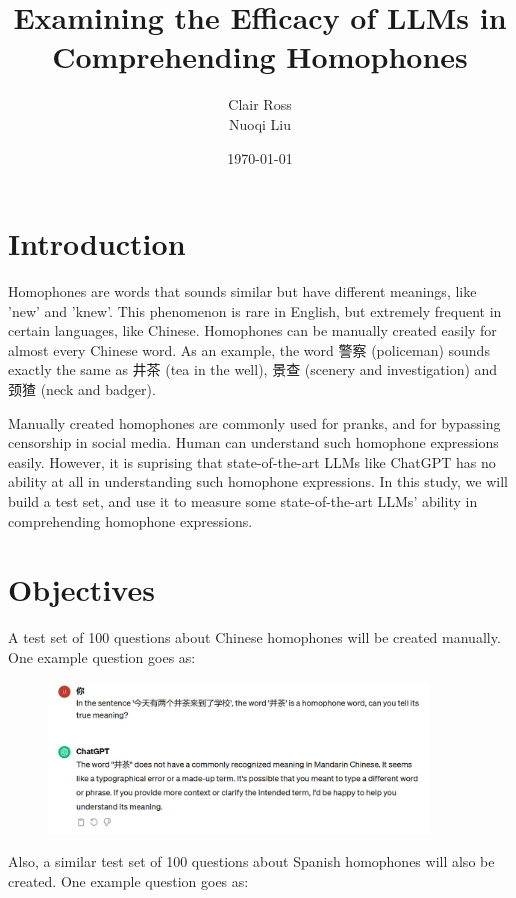 \documentclass{article}
\title{Examining the Efficacy of LLMs in Comprehending Homophones}
\author{Clair Ross\\Nuoqi Liu}
\date{\today}
\begin{document}
\maketitle

\section{Introduction}

Homophones are words that sounds similar but have different meanings, like 'new' and 'knew'. This phenomenon is rare in English, but extremely frequent in certain languages, like Chinese. Homophones can be manually created easily for almost every Chinese word. As an example, the word 警察 (policeman) sounds exactly the same as 井茶 (tea in the well), 景查 (scenery and investigation) and 颈猹 (neck and badger).

Manually created homophones are commonly used for pranks, and for bypassing censorship in social media. Human can understand such homophone expressions easily. However, it is suprising that state-of-the-art LLMs like ChatGPT has no ability at all in understanding such homophone expressions. In this study, we will build a test set, and use it to measure some state-of-the-art LLMs' ability in comprehending homophone expressions.

\section{Objectives}

A test set of 100 questions about Chinese homophones will be created manually. One example question goes as:

\begin{figure}[h]
    \centering
    \includegraphics[width=0.9\textwidth]{example_question_chinese.jpg}
\end{figure}

Also, a similar test set of 100 questions about Spanish homophones will also be created. One example question goes as:
\end{document}
